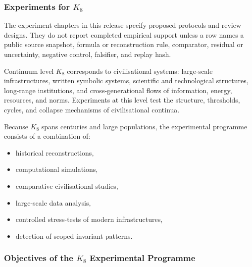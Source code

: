 
\subsubsection{Experiments for \texorpdfstring{$K_8$}{K_8}}

The experiment chapters in this release specify proposed protocols and review designs. They do not report completed empirical support unless a row names a public source snapshot, formula or reconstruction rule, comparator, residual or uncertainty, negative control, falsifier, and replay hash.
\label{sec:experiments-k8}

Continuum level $K_8$ corresponds to civilisational systems:
large-scale infrastructures, written symbolic systems, scientific
and technological structures, long-range institutions, and
cross-generational flows of information, energy, resources, and norms.
Experiments at this level test the structure, thresholds,
cycles, and collapse mechanisms of civilisational continua.

Because $K_8$ spans centuries and large populations, the
experimental programme consists of a combination of:
\begin{itemize}
    \item historical reconstructions,
    \item computational simulations,
    \item comparative civilisational studies,
    \item large-scale data analysis,
    \item controlled stress-tests of modern infrastructures,
    \item detection of scoped invariant patterns.
\end{itemize}



\subsubsection{Objectives of the \texorpdfstring{$K_8$}{K_8} Experimental Programme}


